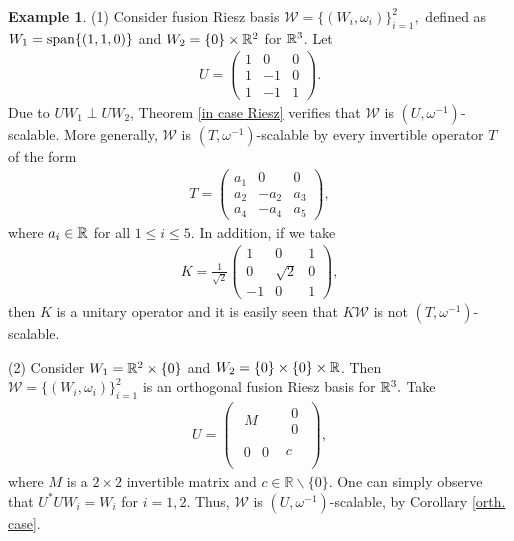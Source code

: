 \documentclass[sn-mathphys-num]{sn-jnl}%
\theoremstyle{definition}
\newtheorem{example}[theorem]{Example}
\theoremstyle{remark}
\numberwithin{equation}{section}
\begin{document}
\begin{example}\label{e.g Riesz}
(1) Consider fusion Riesz basis $\mathcal{W}=\{(W_{i},\omega_{i})\}_{i=1}^{2},$ defined as $W_{1}=\textnormal{span}\{(1,1,0)\}$ and $W_{2}=\{0\}\times \Bbb{R}^{2}$ for $\Bbb{R}^{3}$. Let
\begin{align*}
U=\begin{pmatrix}
   1  & 0 & 0\\
   1  & -1  & 0 \\
   1  & -1  & 1 
\end{pmatrix}.
\end{align*}
Due to $UW_{1}\perp UW_{2}$, Theorem \ref{in case Riesz} verifies that $\mathcal{W}$ is $\left( U,\omega^{-1}\right) $-scalable. More generally, $\mathcal{W}$ is $\left( T,\omega^{-1}\right) $-scalable by every invertible operator $T$ of the form 
\begin{align*}
T=\begin{pmatrix}
   a_{1}  & 0 & 0\\
   a_{2}  & -a_{2}  & a_{3} \\
   a_{4}  & -a_{4}  & a_{5} 
\end{pmatrix},
\end{align*}
where $ a_{i}\in \Bbb{R}$ for all $1 \leq i \leq 5.$ In addition, if we take 
\begin{align*}
K=\frac{1}{\sqrt{2}}\begin{pmatrix}
   1  & 0 & 1\\
   0  & \sqrt{2}   & 0 \\
   -1 & 0  & 1
\end{pmatrix},
\end{align*}
then $K$ is a unitary operator and it is easily seen that $K\mathcal{W}$ is not $\left( T,\omega^{-1}\right) $-scalable.

(2) Consider $ W_{1}=\Bbb{R}^{2}\times \{0\} $ and $ W_{2}=\{0\} \times \{0\}\times \Bbb{R}$. Then $\mathcal{W}=\{(W_{i},\omega_{i})\}_{i=1}^{2} $ is an orthogonal fusion Riesz basis for $\Bbb{R}^{3}.$ Take
\begin{align*}
U=\begin{pmatrix}
 ~~M & \begin{matrix} 0 \\[1ex] 0 \end{matrix} \\
 \begin{matrix} 0 & 0 \end{matrix} & c \\
\end{pmatrix},
\end{align*}
where $M$ is a $2\times 2$ invertible matrix and $c \in \mathbb{R}\smallsetminus \{0\}.$ One can simply observe that $U^*UW_{i}=W_{i}$ for $ i=1,2.$ Thus, $\mathcal{W}$ is $\left( U,\omega^{-1}\right) $-scalable, by Corollary \ref{orth. case}.
\end{example}
\end{document}
